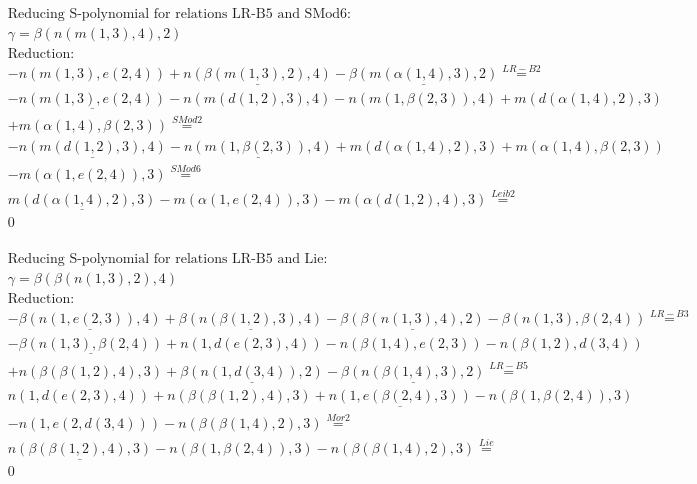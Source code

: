 \documentclass[11pt]{amsart}
\begin{document}
\begin{align*} 
& \text{Reducing S-polynomial for relations LR-B5 and SMod6:} \\ 
& \gamma = \beta(n(m(1,3),4),2) \\ 
& \text{Reduction}: \\& - n(m(1,3),e(2,4)) + \underline{n(\beta(m(1,3),2),4)} - \underline{\beta(m(\alpha(1,4),3),2)} \stackrel{ LR-B2 }{=}  \\ 
& - \underline{n(m(1,3),e(2,4))} - n(m(d(1,2),3),4) - n(m(1,\beta(2,3)),4) + m(d(\alpha(1,4),2),3)\\ 
 &  + m(\alpha(1,4),\beta(2,3)) \stackrel{ SMod2 }{=}  \\ 
& - \underline{n(m(d(1,2),3),4)} - \underline{n(m(1,\beta(2,3)),4)} + m(d(\alpha(1,4),2),3) + m(\alpha(1,4),\beta(2,3))\\ 
 &  - m(\alpha(1,e(2,4)),3) \stackrel{ SMod6 }{=}  \\ 
&\underline{m(d(\alpha(1,4),2),3)} - m(\alpha(1,e(2,4)),3) - m(\alpha(d(1,2),4),3) \stackrel{ Leib2 }{=}  \\ 
&0\\ 
\end{align*} 
 
\begin{align*} 
& \text{Reducing S-polynomial for relations LR-B5 and Lie:} \\ 
& \gamma = \beta(\beta(n(1,3),2),4) \\ 
& \text{Reduction}: \\& - \underline{\beta(n(1,e(2,3)),4)} + \underline{\beta(n(\beta(1,2),3),4)} - \underline{\beta(\beta(n(1,3),4),2)} - \beta(n(1,3),\beta(2,4)) \stackrel{ LR-B3 }{=}  \\ 
& - \underline{\beta(n(1,3),\beta(2,4))} + n(1,d(e(2,3),4)) - n(\beta(1,4),e(2,3)) - n(\beta(1,2),d(3,4))\\ 
 &  + n(\beta(\beta(1,2),4),3) + \underline{\beta(n(1,d(3,4)),2)} - \underline{\beta(n(\beta(1,4),3),2)} \stackrel{ LR-B5 }{=}  \\ 
&n(1,d(e(2,3),4)) + n(\beta(\beta(1,2),4),3) + \underline{n(1,e(\beta(2,4),3))} - n(\beta(1,\beta(2,4)),3)\\ 
 &  - n(1,e(2,d(3,4))) - n(\beta(\beta(1,4),2),3) \stackrel{ Mor2 }{=}  \\ 
&\underline{n(\beta(\beta(1,2),4),3)} - n(\beta(1,\beta(2,4)),3) - n(\beta(\beta(1,4),2),3) \stackrel{ Lie }{=}  \\ 
&0\\ 
\end{align*} 
 
\end{document}
